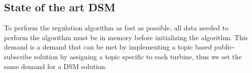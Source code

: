 %
%
%
%
%
%
%
%



\subsection{State of the art DSM}

To perform the regulation algorithm as fast as possible, all data needed to perform the algorithm must be in memory before initializing the algorithm. This demand is a demand that can be met by implementing a topic based public-subscribe solution by assigning a topic specific to each turbine, thus we set the same demand for a DSM solution.

